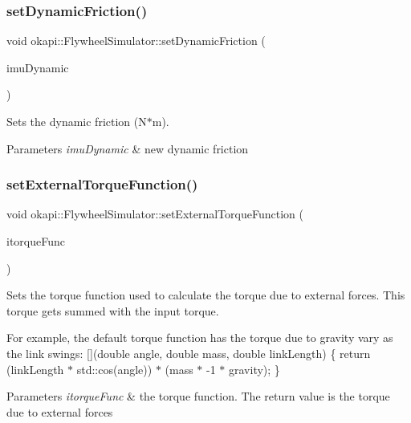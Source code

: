 \subsubsection{\texorpdfstring{setDynamicFriction()}{setDynamicFriction()}}
{\footnotesize\ttfamily void okapi\+::\+Flywheel\+Simulator\+::set\+Dynamic\+Friction (\begin{DoxyParamCaption}\item[{double}]{imu\+Dynamic }\end{DoxyParamCaption})}

Sets the dynamic friction (N$\ast$m).


\begin{DoxyParams}{Parameters}
{\em imu\+Dynamic} & new dynamic friction \\
\hline
\end{DoxyParams}
\mbox{\label{classokapi_1_1FlywheelSimulator_a288c47223f4e558c0081c91db1180430}} 
\subsubsection{\texorpdfstring{setExternalTorqueFunction()}{setExternalTorqueFunction()}}
{\footnotesize\ttfamily void okapi\+::\+Flywheel\+Simulator\+::set\+External\+Torque\+Function (\begin{DoxyParamCaption}\item[{std\+::function$<$ double(double \mbox{\hyperlink{classokapi_1_1FlywheelSimulator_ab52c0add6fc410b93ce91ff29bf3c85b}{angle}}, double \mbox{\hyperlink{classokapi_1_1FlywheelSimulator_a889583a4674ea4e9a611c88a621deb3b}{mass}}, double link\+Length)$>$}]{itorque\+Func }\end{DoxyParamCaption})}

Sets the torque function used to calculate the torque due to external forces. This torque gets summed with the input torque.

For example, the default torque function has the torque due to gravity vary as the link swings\+: \mbox{[}\mbox{]}(double angle, double mass, double link\+Length) \{ return (link\+Length $\ast$ std\+::cos(angle)) $\ast$ (mass $\ast$ -\/1 $\ast$ gravity); \}


\begin{DoxyParams}{Parameters}
{\em itorque\+Func} & the torque function. The return value is the torque due to external forces \\
\hline
\end{DoxyParams}
\mbox{\label{classokapi_1_1FlywheelSimulator_a54ebeed8e7eefd19b0d476a3215b18e7}} 
